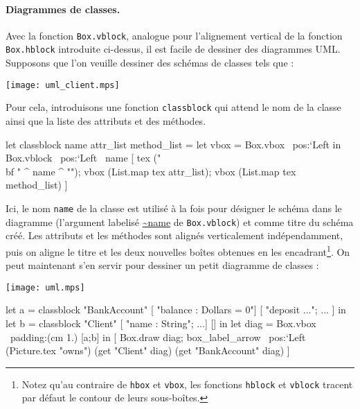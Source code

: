 \documentclass[twoside]{studia-Hermann}
\begin{document}

\paragraph{Diagrammes de classes.}
Avec la fonction \texttt{Box.vblock}, analogue pour l'alignement
vertical de la fonction
\texttt{Box.hblock} introduite ci-dessus, il est facile
de dessiner des diagrammes UML. Supposons que l'on veuille dessiner
des schémas de classes tels que :
\begin{center}
  \texttt{[image: uml\_client.mps]}
\end{center}
Pour cela, introduisons une fonction \texttt{classblock} qui attend le
nom de la classe ainsi que la liste des attributs et des méthodes. 
\begin{ocaml}
let classblock name attr_list method_list = 
  let vbox = Box.vbox ~pos:`Left in
  Box.vblock ~pos:`Left ~name
  [ tex ("{\\bf " ^ name ^ "}");
    vbox (List.map tex attr_list); 
    vbox (List.map tex method_list) ]
\end{ocaml}
Ici, le nom \texttt{name} de la classe est utilisé à la fois pour
désigner le schéma dans le diagramme (l'argument labelisé \url{~name}
de \texttt{Box.vblock}) et comme titre du schéma créé. Les attributs
et les méthodes sont alignés verticalement indépendamment, puis on
aligne le titre et les deux nouvelles boîtes obtenues en les
encadrant\footnote{Notez qu'au contraire de {\tt hbox} et {\tt vbox}, les
fonctions {\tt hblock} et {\tt vblock} tracent par défaut le contour
de leurs sous-boîtes.}.  On peut maintenant s'en servir pour dessiner un
petit diagramme de classes :

\medskip
\begin{minipage}{0.38\linewidth}
  \texttt{[image: uml.mps]}
\end{minipage}
\begin{minipage}{0.6\linewidth}
\small\begin{ocaml}
let a = classblock "BankAccount" 
  [ "balance : Dollars = $0$"] 
  [ "deposit ..."; ... ] in
let b = classblock "Client" 
  [ "name : String"; ...] [] in
let diag = 
  Box.vbox ~padding:(cm 1.) [a;b] 
in
[ Box.draw diag; 
  box_label_arrow ~pos:`Left 
    (Picture.tex "owns") 
    (get "Client" diag) 
    (get "BankAccount" diag) ]
\end{ocaml}
\end{minipage}
\vspace{1em}
\end{document}
